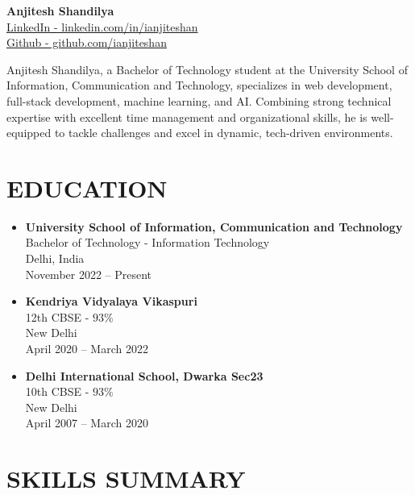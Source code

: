 \documentclass{article}
\begin{document}
\begin{center}
    {\LARGE \textbf{Anjitesh Shandilya}}\\[0.5em]
    \href{https://linkedin.com/in/ianjiteshan}{LinkedIn - linkedin.com/in/ianjiteshan} \\
    \href{https://github.com/ianjiteshan}{Github - github.com/ianjiteshan}
\end{center}

Anjitesh Shandilya, a Bachelor of Technology student at the University School of Information, Communication and Technology, specializes in web development, full-stack development, machine learning, and AI. Combining strong technical expertise with excellent time management and organizational skills, he is well-equipped to tackle challenges and excel in dynamic, tech-driven environments.

\section*{EDUCATION}

\begin{itemize}[leftmargin=*]
    \item \textbf{University School of Information, Communication and Technology} \\
    Bachelor of Technology - Information Technology \\
    Delhi, India \\
    November 2022 -- Present
    
    \item \textbf{Kendriya Vidyalaya Vikaspuri} \\
    12th CBSE - $93\%$ \\
    New Delhi \\
    April 2020 -- March 2022
    
    \item \textbf{Delhi International School, Dwarka Sec23} \\
    10th CBSE - $93\%$ \\
    New Delhi \\
    April 2007 -- March 2020
\end{itemize}

\section*{SKILLS SUMMARY}
\end{document}
